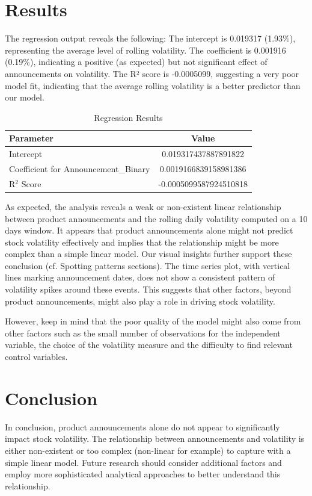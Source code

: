 \documentclass[12pt, oneside]{article}
\begin{document}
\section{Results}
The regression output reveals the following: The intercept is 0.019317 (1.93\%), representing the average level of rolling volatility. The coefficient is 0.001916 (0.19\%), indicating a positive (as expected) but not significant effect of announcements on volatility. The R² score is -0.0005099, suggesting a very poor model fit, indicating that the average rolling volatility is a better predictor than our model.
\begin{table}[ht]
    \centering
    \begin{tabular}{lc}
        \toprule
        \textbf{Parameter} & \textbf{Value} \\
        \midrule
        Intercept & 0.019317437887891822 \\
        Coefficient for Announcement\_Binary & 0.0019166839158981386 \\
        R\(^2\) Score & -0.0005099587924510818 \\
        \bottomrule
    \end{tabular}
    \caption{Regression Results}
    \label{tab:regression_outputs}
\end{table}


As expected, the analysis reveals a weak or non-existent linear relationship between product announcements and the rolling daily volatility computed on a 10 days window. It appears that product announcements alone might not predict stock volatility effectively and implies that the relationship might be more complex than a simple linear model. Our visual insights further support these conclusion (cf. Spotting patterns sections). The time series plot, with vertical lines marking announcement dates, does not show a consistent pattern of volatility spikes around these events. This suggests that other factors, beyond product announcements, might also play a role in driving stock volatility.

However, keep in mind that the poor quality of the model might also come from other factors such as the small number of observations for the independent variable, the choice of the volatility measure and the difficulty to find relevant control variables.


\section{Conclusion}
In conclusion, product announcements alone do not appear to significantly impact stock volatility. The relationship between announcements and volatility is either non-existent or too complex (non-linear for example) to capture with a simple linear model. Future research should consider additional factors and employ more sophisticated analytical approaches to better understand this relationship.
\end{document}

